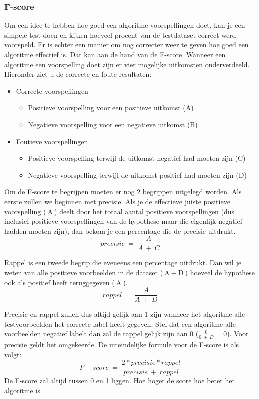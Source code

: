 \subsubsection{F-score}
\label{sec:fscore}
Om een idee te hebben hoe goed een algoritme voorspellingen doet, kan je een simpele test doen en kijken hoeveel procent van de testdataset correct werd voorspeld. Er is echter een manier om nog correcter weer te geven hoe goed een algoritme effectief is. Dat kan aan de hand van de F-score. \newline
Wanneer een algoritme een voorspelling doet zijn er vier mogelijke uitkomsten onderverdeeld. Hieronder ziet u de correcte en foute resultaten:
\begin{itemize}
	\item Correcte voorspellingen
	\begin{itemize}
		\item Positieve voorspelling voor een positieve uitkomst  (A)
		\item Negatieve voorspelling voor een negatieve uitkomst (B)
	\end{itemize}
	\item Foutieve voorspellingen
	\begin{itemize}
		\item Positieve voorspelling terwijl de uitkomst negatief had moeten zijn (C)
		\item Negatieve voorspelling terwijl de uitkomst positief had moeten zijn (D)
	\end{itemize}
\end{itemize}

Om de F-score te begrijpen moeten er nog 2 begrippen uitgelegd worden. Als eerste zullen we beginnen met precisie. \newline 
Als je de effectieve juiste positieve voorspelling ($\:$A$\:$) deelt door het totaal aantal positieve voorspellingen (dus inclusief positieve voorspellingen van de hypothese maar die eigenlijk negatief hadden moeten zijn), dan bekom je een percentage die de precisie uitdrukt. $$precisie\:=\:\frac{A}{A\:+\:C}$$

Rappel is een tweede begrip die eveneens een percentage uitdrukt. Dan wil je weten van alle positieve voorbeelden in de dataset ($\:$A$\:$+$\:$D$\:$) hoeveel de hypothese ook als positief heeft teruggegeven ($\:$A$\:$). $$rappel\:=\: \frac{A}{A\:+\:D}$$

Precisie en rappel zullen dus altijd gelijk aan 1 zijn wanneer het algoritme alle testvoorbeelden het correcte label heeft gegeven. Stel dat een algoritme alle voorbeelden negatief labelt dan zal de rappel gelijk zijn aan 0 ($\frac{0}{0\:+\:D}=0$). Voor precisie geldt het omgekeerde.
De uiteindelijke formule voor de F-score is als volgt: 
$$F-score\:=\: \frac{2* precisie * rappel}{precisie\:+\:rappel}$$
De F-score zal altijd tussen 0 en 1 liggen. Hoe hoger de score hoe beter het algoritme is. 

